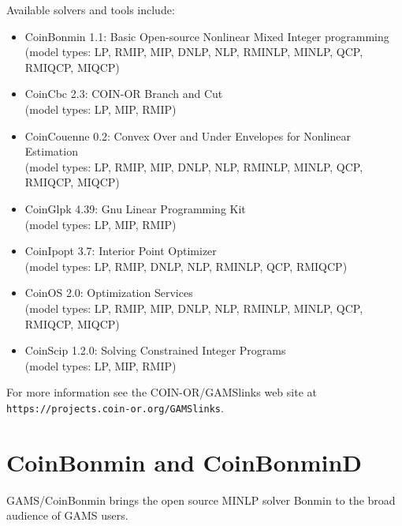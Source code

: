Available solvers and tools include:
\begin{itemize}
\item CoinBonmin 1.1: Basic Open-source Nonlinear Mixed Integer programming\\
(model types: LP, RMIP, MIP, DNLP, NLP, RMINLP, MINLP, QCP, RMIQCP, MIQCP)
\item CoinCbc 2.3: COIN-OR Branch and Cut\\
(model types: LP, MIP, RMIP)
\item CoinCouenne 0.2: Convex Over and Under Envelopes for Nonlinear Estimation\\
(model types: LP, RMIP, MIP, DNLP, NLP, RMINLP, MINLP, QCP, RMIQCP, MIQCP)
\item CoinGlpk 4.39: Gnu Linear Programming Kit\\
(model types: LP, MIP, RMIP)
\item CoinIpopt 3.7: Interior Point Optimizer\\
(model types: LP, RMIP, DNLP, NLP, RMINLP, QCP, RMIQCP)
\item CoinOS 2.0: Optimization Services\\
(model types: LP, RMIP, MIP, DNLP, NLP, RMINLP, MINLP, QCP, RMIQCP, MIQCP)
\item CoinScip 1.2.0: Solving Constrained Integer Programs\\
(model types: LP, MIP, RMIP)
\end{itemize}

% 

For more information see the COIN-OR/GAMSlinks web site at
\texttt{https://projects.coin-or.org/GAMSlinks}.

\section{CoinBonmin and CoinBonminD}

GAMS/CoinBonmin brings the open source MINLP solver Bonmin to the broad audience of GAMS users.

